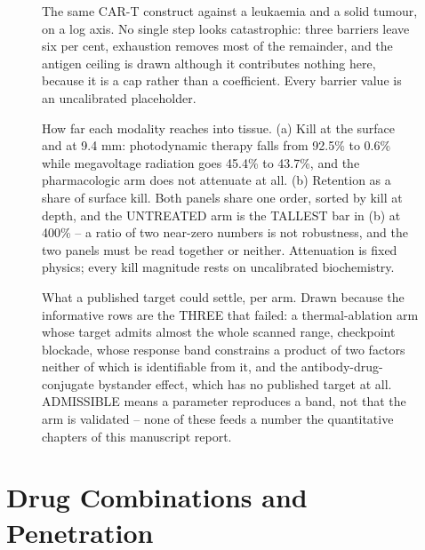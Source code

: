 \documentclass[11pt,twoside,openright]{report}
\begin{document}
\begin{figure}[tbp]
\setcounter{figure}{27}
\caption{The same CAR-T construct against a leukaemia and a solid tumour, on a log axis. No single step looks catastrophic: three barriers leave six per cent, exhaustion removes most of the remainder, and the antigen ceiling is drawn although it contributes nothing here, because it is a cap rather than a coefficient. Every barrier value is an uncalibrated placeholder.}
\label{fig:fig33_adoptive_barriers}
\end{figure}

\begin{figure}[tbp]
\setcounter{figure}{29}
\caption{How far each modality reaches into tissue. (a) Kill at the surface and at 9.4 mm: photodynamic therapy falls from 92.5\% to 0.6\% while megavoltage radiation goes 45.4\% to 43.7\%, and the pharmacologic arm does not attenuate at all. (b) Retention as a share of surface kill. Both panels share one order, sorted by kill at depth, and the UNTREATED arm is the TALLEST bar in (b) at 400\% -- a ratio of two near-zero numbers is not robustness, and the two panels must be read together or neither. Attenuation is fixed physics; every kill magnitude rests on uncalibrated biochemistry.}
\label{fig:fig34_depth_reach}
\end{figure}

\begin{figure}[tbp]
\setcounter{figure}{30}
\caption{What a published target could settle, per arm. Drawn because the informative rows are the THREE that failed: a thermal-ablation arm whose target admits almost the whole scanned range, checkpoint blockade, whose response band constrains a product of two factors neither of which is identifiable from it, and the antibody-drug-conjugate bystander effect, which has no published target at all. ADMISSIBLE means a parameter reproduces a band, not that the arm is validated -- none of these feeds a number the quantitative chapters of this manuscript report.}
\label{fig:fig35_calibration_verdicts}
\end{figure}

\chapter{Drug Combinations and Penetration}
\end{document}
